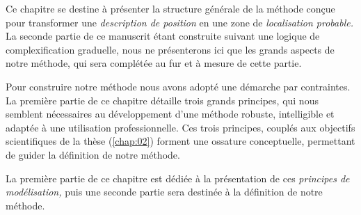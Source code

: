 Ce chapitre se destine à présenter la structure générale de la méthode
conçue pour transformer une \emph{description de position} en une zone
de \emph{localisation probable.} La seconde partie de ce manuscrit
étant construite suivant une logique de complexification graduelle,
nous ne présenterons ici que les grands aspects de notre méthode, qui
sera complétée au fur et à mesure de cette partie.

Pour construire notre méthode nous avons adopté une démarche par
contraintes. La première partie de ce chapitre détaille trois grands
principes, qui nous semblent nécessaires au développement d'une
méthode robuste, intelligible et adaptée à une utilisation
professionnelle. Ces trois principes, couplés aux objectifs
scientifiques de la thèse (\autoref{chap:02}) forment une ossature
conceptuelle, permettant de guider la définition de notre méthode.

La première partie de ce chapitre est dédiée à la présentation de ces
\emph{principes de modélisation,} puis une seconde partie sera
destinée à la définition de notre méthode.
